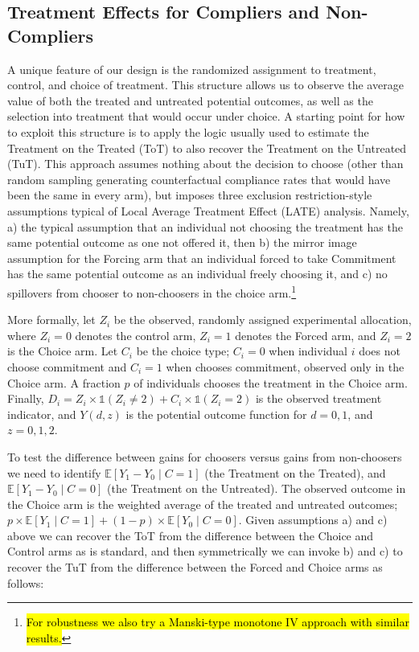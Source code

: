 \documentclass[oneside,11pt]{article}
\begin{document}
\subsection{Treatment Effects for Compliers and Non-Compliers}

A unique feature of our design is the randomized assignment to treatment, control, and choice of treatment.  This structure allows us to observe the average value of both the treated and untreated potential outcomes, as well as the selection into treatment that would occur under choice.  A starting point for how to exploit this structure is to apply the logic usually used to estimate the Treatment on the Treated (ToT) to also recover the Treatment on the Untreated (TuT).  This approach assumes nothing about the decision to choose (other than random sampling generating counterfactual compliance rates that would have been the same in every arm), but imposes three exclusion restriction-style assumptions typical of Local Average Treatment Effect (LATE) analysis.  Namely, a) the typical assumption that an individual not choosing the treatment has the same potential outcome as one not offered it, then b) the mirror image assumption for the Forcing arm that an individual forced to take Commitment has the same potential outcome as an individual freely choosing it, and c) no spillovers from chooser to non-choosers in the choice arm.\footnote{\hl{For robustness we also try a Manski-type monotone IV approach with similar results.}}


More formally, let $Z_i$ be the observed, randomly assigned experimental allocation, where $Z_i=0$ denotes the control arm, $Z_i=1$ denotes the Forced arm, and $Z_i=2$ is the Choice arm.  Let $C_i$ be the choice type; $C_i=0$ when individual $i$ does not choose commitment and $C_i=1$ when chooses commitment, observed only in the Choice arm.  A fraction $p$ of individuals chooses the treatment in the Choice arm.  Finally, $D_i = Z_i\times \mathds{1}(Z_i\neq 2) + C_i\times \mathds{1}(Z_i=2)$ is the observed treatment indicator, and $Y(d,z)$ is the potential outcome function for $d=0,1$, and $z=0,1,2$.


To test the difference between gains for choosers versus gains from non-choosers we need to identify $\mathbb{E}[Y_1-Y_0\;|\;C=1]$ (the Treatment on the Treated), and $\mathbb{E}[Y_1-Y_0\;|\;C=0]$ (the Treatment on the Untreated).   The observed outcome in the Choice arm is the weighted average of the treated and untreated outcomes; $p \times\mathbb{E}[Y_1\;|\;C=1] + (1-p)\times\mathbb{E}[Y_0\;|\;C=0]$.  Given assumptions a) and c) above we can recover the ToT from the difference between the Choice and Control arms as is standard, and then symmetrically we can invoke b) and c) to recover the TuT from the difference between the Forced and Choice arms as follows:
\end{document}

